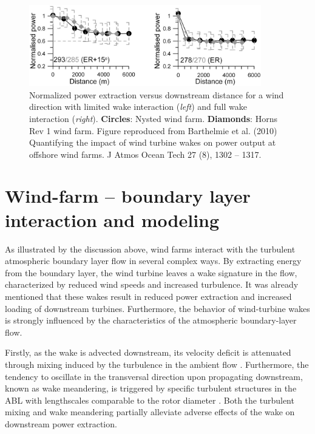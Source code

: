 \begin{figure}[t]
	\centering
	\includegraphics[width=0.9\textwidth]{chapters/introduction/power_barthelmie.eps}
	\caption{Normalized power extraction versus downstream distance for a wind direction with limited wake interaction (\emph{left}) and full wake interaction (\emph{right}). \textbf{Circles}: Nysted wind farm. {\color{gray} \textbf{Diamonds}}: Horns Rev 1 wind farm. Figure reproduced from Barthelmie et al. (2010) Quantifying the impact of wind turbine wakes on power output at offshore wind farms. J Atmos Ocean Tech 27 (8), 1302 -- 1317. \label{fig:power_deficiency}}
\end{figure}

\section{Wind-farm -- boundary layer interaction and modeling}\label{sec:intro_wfbl}
As illustrated by the discussion above, wind farms interact with the turbulent atmospheric boundary layer flow in several complex ways. By extracting energy from the boundary layer, the wind turbine leaves a wake signature in the flow, characterized by reduced wind speeds and increased turbulence. It was already mentioned that these wakes result in reduced power extraction and increased loading of downstream turbines. Furthermore, the behavior of wind-turbine wakes is strongly influenced by the characteristics of the atmospheric boundary-layer flow. 

Firstly, as the wake is advected downstream, its velocity deficit is attenuated through mixing induced by the turbulence in the ambient flow \citep{Chamorro2009}. Furthermore, the tendency to oscillate in the transversal direction upon propagating downstream, known as wake meandering, is triggered by specific turbulent structures in the ABL with lengthscales comparable to the rotor diameter \citep{espana2011spatial,espanawind}. Both the turbulent mixing and wake meandering partially alleviate adverse effects of the wake on downstream power extraction. 

